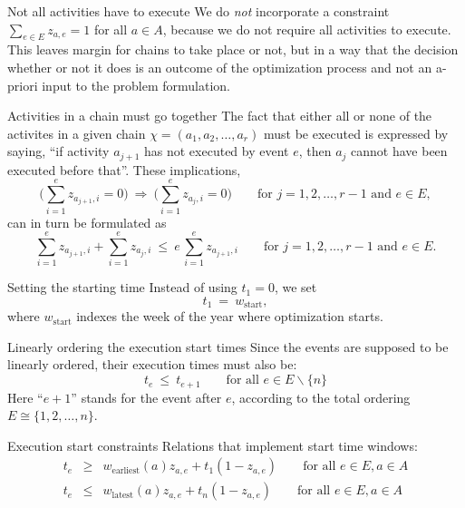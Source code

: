 \documentclass[11pt,reqno]{amsart}
\numberwithin{equation}{section}
\begin{document}
\begin{mydesc}

\item[Not all activities have to execute] We do \emph{not} incorporate a constraint
  $\sum_{e\in E} z_{a,e}=1$ for all $a\in A$, because we do not require all activities to
  execute. This leaves margin for chains to take place or not, but in a way that the
  decision whether or not it does is an outcome of the optimization process and not an
  a-priori input to the problem formulation.

\item[Activities in a chain must go together] The fact that either all or none of the
  activites in a given chain $\chi=(a_1,a_2,\dots,a_r)$ must be executed is expressed by
  saying, ``if activity $a_{j+1}$ has not executed by event $e$, then $a_j$ cannot have
  been executed before that''. These implications,
  \[
     \Big(\sum_{i=1}^e z_{a_{j+1},i}=0\Big)
      \ \Longrightarrow \
      \Big(\sum_{i=1}^e z_{a_j,i}=0\Big)
     \qquad\text{for } j=1,2,\dots,r-1
     \text{ and } e\in E,
  \]
  can in turn be formulated as
  \begin{equation}\label{ineq:chain}
    \sum_{i=1}^e z_{a_{j+1},i} + \sum_{i=1}^e z_{a_j, i} 
    \ \le \
    e\, \sum_{i=1}^e z_{a_{j+1}, i}
    \qquad\text{for } j=1,2,\dots, r-1
     \text{ and } e\in E.
  \end{equation}

\item[Setting the starting time] Instead of using $t_1=0$, we set
  \begin{equation}
     t_1
     \ = \
     w_{\text{start}},
  \end{equation}
  where $w_{\text{start}}$ indexes the week of the year where optimization starts. 

\item[Linearly ordering the execution start times] Since the events are supposed to be linearly
  ordered,  their execution times must also be:
  \begin{equation}
     t_e 
     \ \le \
     t_{e+1}
     \qquad\text{for all }
      e\in E\smallsetminus\{n\}
  \end{equation}
  Here ``$e+1$'' stands for the event after $e$, according to the total ordering
  $E\cong\{1,2,\dots,n\}$.

\item[Execution start constraints] Relations that implement start time windows:
  \begin{eqnarray}
    t_e 
    & \ge &
    w_{\text{earliest}}(a) z_{a,e} + t_1 (1-z_{a,e})
    \qquad\text{for all } e\in E, a\in A
    \\
    t_e 
    & \le &
    w_{\text{latest}}(a) z_{a,e} + t_n(1-z_{a,e})
    \qquad\text{for all } e\in E, a\in A
  \end{eqnarray}
  


\end{mydesc}
\end{document}
